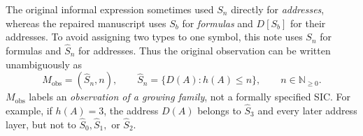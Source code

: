 \documentclass[11pt,letterpaper]{article}
\begin{document}
The original informal expression sometimes used $S_n$ directly for \emph{addresses}, whereas the repaired manuscript uses $S_b$ for \emph{formulas} and $D[S_b]$ for their addresses. To avoid assigning two types to one symbol, this note uses $S_n$ for formulas and $\widehat S_n$ for addresses. Thus the original observation can be written unambiguously as
\begin{equation}\label{eq:original}
M_{\mathrm{obs}}=(\widehat S_n,n),\qquad
\widehat S_n=\{D(A):h(A)\le n\},\qquad n\in\mathbb N_{\ge0}.
\end{equation}
$M_{\mathrm{obs}}$ labels an \emph{observation of a growing family}, not a formally specified SIC. For example, if $h(A)=3$, the address $D(A)$ belongs to $\widehat S_3$ and every later address layer, but not to $\widehat S_0,\widehat S_1,$ or $\widehat S_2$.
\end{document}
